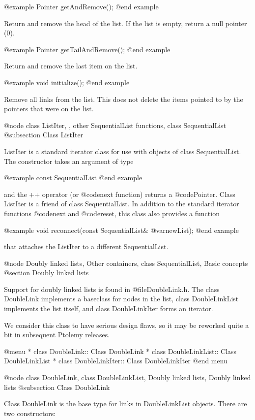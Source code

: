 @example
Pointer getAndRemove();
@end example

Return and remove the head of the list.  If the list is empty, return
a null pointer (0).

@example
Pointer getTailAndRemove();
@end example

Return and remove the last item on the list.

@example
void initialize();
@end example

Remove all links from the list.  This does not delete the items pointed
to by the pointers that were on the list.

@node class ListIter,  , other SequentialList functions, class SequentialList
@subsection Class ListIter

ListIter is a standard iterator class for use with objects of class
SequentialList.  The constructor takes an argument of type

@example
const SequentialList
@end example

and the ++ operator (or @code{next} function) returns a @code{Pointer}.
Class ListIter is a friend of class SequentialList.
In addition to the standard iterator functions @code{next} and
@code{reset}, this class also provides a function

@example
void reconnect(const SequentialList& @var{newList});
@end example

that attaches the ListIter to a different SequentialList.

@node Doubly linked lists, Other containers, class SequentialList, Basic concepts
@section Doubly linked lists

Support for doubly linked lists is found in @file{DoubleLink.h}.  The class
DoubleLink implements a baseclass for nodes in the list, class
DoubleLinkList implements the list itself, and class DoubleLinkIter forms an
iterator.

We consider this class to have serious design flaws, so it may be
reworked quite a bit in subsequent Ptolemy releases.

@menu
* class DoubleLink::            Class DoubleLink
* class DoubleLinkList::        Class DoubleLinkList
* class DoubleLinkIter::        Class DoubleLinkIter
@end menu

@node class DoubleLink, class DoubleLinkList, Doubly linked lists, Doubly linked lists
@subsection Class DoubleLink

Class DoubleLink is the base type for links in DoubleLinkList objects.
There are two constructors:


